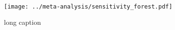 \begin{figure}[p]


\texttt{[image: ../meta-analysis/sensitivity\_forest.pdf]}

\caption[short caption]{long caption}
\end{figure}
